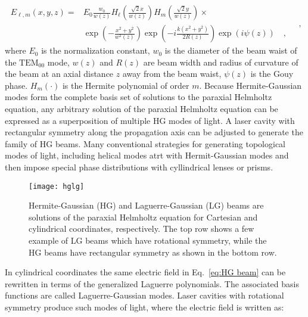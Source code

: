 \begin{equation}
\label{eq:HG beam}
\begin{split}
E_{\ell,m}(x,y,z) = & E_0 \frac{w_0}{w(z)} H_{\ell}\left( \frac{\sqrt{2}x}{w(z)}\right) H_{m}\left(\frac{\sqrt{2}y}{w(z)}\right) \times \\
& \exp \left(-\frac{x^2 + y^2}{w^2 (z)}\right) \exp \left(-i\frac{k(x^2 + y^2)}{2R(z)}\right) \exp (i\psi (z)) \quad ,
\end{split} \quad ,
\end{equation}
where $E_0$ is the normalization constant, $w_0$ is the diameter of the beam waist of the $\mathrm{TEM}_{00}$ mode, $w(z)$ and $R(z)$ are beam width and radius of curvature of the beam at an axial distance $z$ away from the beam waist, $\psi (z)$ is the Gouy phase. $H_{m}(\cdot)$ is the Hermite polynomial \cite{abramowitz+stegun} of order $m$. Because Hermite-Gaussian modes form the complete basis set of solutions to the paraxial Helmholtz equation, any arbitrary solution of the paraxial Helmholtz equation can be expressed as a superposition of multiple HG modes of light. A laser cavity with rectangular symmetry along the propagation axis can be adjusted to generate the family of HG beams. Many conventional strategies for generating topological modes of light, including helical modes atrt with Hermit-Gaussian modes and then impose special phase distributions with cyllindrical lenses or prisms.

\begin{figure}[t!]
  \centering
  \texttt{[image: hglg]}
  \caption{Hermite-Gaussian (HG) and Laguerre-Gaussian (LG) beams are solutions of the paraxial Helmholtz equation for Cartesian and cylindrical coordinates, respectively. The top row shows a few example of LG beams which have rotational symmetry, while the HG beams have rectangular symmetry as shown in the bottom row.}
  \label{fig:hglg}
\end{figure}


In cylindrical coordinates the same electric field in Eq.~\eqref{eq:HG beam} can be rewritten in terms of the generalized Laguerre polynomials. The associated basis functions are called Laguerre-Gaussian modes. Laser cavities with rotational symmetry produce such modes of light, where the electric field is written as:

